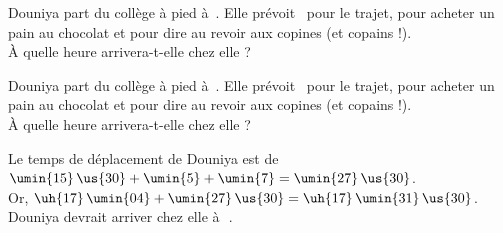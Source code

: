 \begin{exercice}
    Douniya part du collège à pied à \,. Elle prévoit \, pour le trajet,  pour acheter un pain au chocolat et  pour dire au revoir aux copines (et copains !). \\
    À quelle heure arrivera-t-elle chez elle ?

 \end{exercice}
 
 \begin{corrige}
    Douniya part du collège à pied à \,. Elle prévoit \, pour le trajet,  pour acheter un pain au chocolat et  pour dire au revoir aux copines (et copains !). \\
    À quelle heure arrivera-t-elle chez elle ?

    {\red Le temps de déplacement de Douniya est de \\
    $\umin{15}\,\us{30}+\umin{5}+\umin{7} =\umin{27}\,\us{30}$. \\
    Or, $\uh{17}\,\umin{04}+\umin{27}\,\us{30} =\uh{17}\,\umin{31}\,\us{30}$. \\
    Douniya devrait arriver chez elle à \,\,.
    }
 \end{corrige}